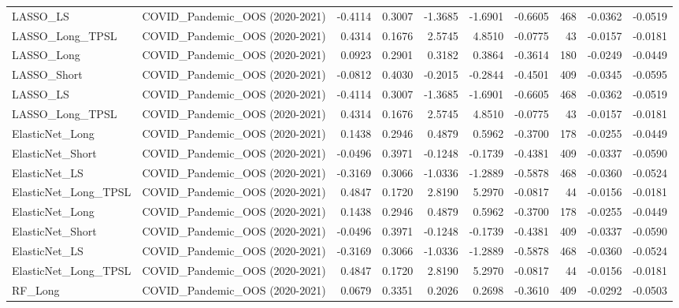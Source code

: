 \begin{tabular}{llrrrrrrrr}
\cline{1-10}
LASSO\_LS & COVID\_Pandemic\_OOS (2020-2021) & -0.4114 & 0.3007 & -1.3685 & -1.6901 & -0.6605 & 468 & -0.0362 & -0.0519 \\
\cline{1-10}
LASSO\_Long\_TPSL & COVID\_Pandemic\_OOS (2020-2021) & 0.4314 & 0.1676 & 2.5745 & 4.8510 & -0.0775 & 43 & -0.0157 & -0.0181 \\
\cline{1-10}
LASSO\_Long & COVID\_Pandemic\_OOS (2020-2021) & 0.0923 & 0.2901 & 0.3182 & 0.3864 & -0.3614 & 180 & -0.0249 & -0.0449 \\
\cline{1-10}
LASSO\_Short & COVID\_Pandemic\_OOS (2020-2021) & -0.0812 & 0.4030 & -0.2015 & -0.2844 & -0.4501 & 409 & -0.0345 & -0.0595 \\
\cline{1-10}
LASSO\_LS & COVID\_Pandemic\_OOS (2020-2021) & -0.4114 & 0.3007 & -1.3685 & -1.6901 & -0.6605 & 468 & -0.0362 & -0.0519 \\
\cline{1-10}
LASSO\_Long\_TPSL & COVID\_Pandemic\_OOS (2020-2021) & 0.4314 & 0.1676 & 2.5745 & 4.8510 & -0.0775 & 43 & -0.0157 & -0.0181 \\
\cline{1-10}
ElasticNet\_Long & COVID\_Pandemic\_OOS (2020-2021) & 0.1438 & 0.2946 & 0.4879 & 0.5962 & -0.3700 & 178 & -0.0255 & -0.0449 \\
\cline{1-10}
ElasticNet\_Short & COVID\_Pandemic\_OOS (2020-2021) & -0.0496 & 0.3971 & -0.1248 & -0.1739 & -0.4381 & 409 & -0.0337 & -0.0590 \\
\cline{1-10}
ElasticNet\_LS & COVID\_Pandemic\_OOS (2020-2021) & -0.3169 & 0.3066 & -1.0336 & -1.2889 & -0.5878 & 468 & -0.0360 & -0.0524 \\
\cline{1-10}
ElasticNet\_Long\_TPSL & COVID\_Pandemic\_OOS (2020-2021) & 0.4847 & 0.1720 & 2.8190 & 5.2970 & -0.0817 & 44 & -0.0156 & -0.0181 \\
\cline{1-10}
ElasticNet\_Long & COVID\_Pandemic\_OOS (2020-2021) & 0.1438 & 0.2946 & 0.4879 & 0.5962 & -0.3700 & 178 & -0.0255 & -0.0449 \\
\cline{1-10}
ElasticNet\_Short & COVID\_Pandemic\_OOS (2020-2021) & -0.0496 & 0.3971 & -0.1248 & -0.1739 & -0.4381 & 409 & -0.0337 & -0.0590 \\
\cline{1-10}
ElasticNet\_LS & COVID\_Pandemic\_OOS (2020-2021) & -0.3169 & 0.3066 & -1.0336 & -1.2889 & -0.5878 & 468 & -0.0360 & -0.0524 \\
\cline{1-10}
ElasticNet\_Long\_TPSL & COVID\_Pandemic\_OOS (2020-2021) & 0.4847 & 0.1720 & 2.8190 & 5.2970 & -0.0817 & 44 & -0.0156 & -0.0181 \\
\cline{1-10}
RF\_Long & COVID\_Pandemic\_OOS (2020-2021) & 0.0679 & 0.3351 & 0.2026 & 0.2698 & -0.3610 & 409 & -0.0292 & -0.0503 \\

\end{tabular}
